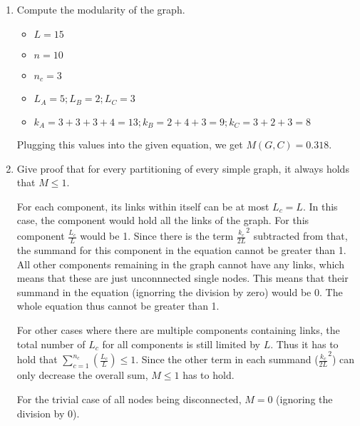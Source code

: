 

\begin{enumerate}
	\item Compute the modularity of the graph.
	\begin{itemize}
		\item $L = 15$
		\item $n = 10$
		\item $n_c = 3$
		\item $L_A = 5 ; L_B = 2 ; L_C = 3$
		\item $k_A = 3 + 3 + 3 + 4 = 13 ; k_B = 2 + 4 + 3 = 9 ; k_C = 3 + 2 + 3 = 8$
	\end{itemize}
	
	Plugging this values into the given equation, we get $M(G,C) = 0.318$.
	
	\item Give proof that for every partitioning of every simple graph, it always holds that $M \leq 1$.
	
	For each component, its links within itself can be at most $L_c = L$. In this case, the component would hold all the links of the graph. For this component $\frac{L_c}{L}$ would be 1.  Since there is the term $\frac{k_c}{2L}^2$ subtracted from that, the summand for this component in the equation cannot be greater than 1. All other components remaining in the graph cannot have any links, which means that these are just unconnnected single nodes.  This means that their summand in the equation (ignorring the division by zero) would be 0. The whole equation thus cannot be greater than 1.
	
	For other cases where there are multiple components containing links, the total number of $L_c$ for all components is still limited by $L$. Thus it has to hold that $\sum^{n_c}_{c=1}(\frac{L_c}{L}) \leq 1$. Since the other term in each summand ($\frac{k_c}{2L}^2$) can only decrease the overall sum, $M \leq 1$ has to hold.
	
	For the trivial case of all nodes being disconnected, $M = 0$ (ignoring the division by 0).
	
\end{enumerate}